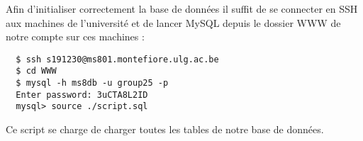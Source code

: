 Afin d'initialiser correctement la base de données il suffit de se connecter en SSH aux machines de l'université et de lancer MySQL depuis le dossier WWW de 
notre compte sur ces machines :

\begin{verbatim}
  $ ssh s191230@ms801.montefiore.ulg.ac.be
  $ cd WWW
  $ mysql -h ms8db -u group25 -p
  Enter password: 3uCTA8L2ID
  mysql> source ./script.sql
\end{verbatim}

Ce script se charge de charger toutes les tables de notre base de données.